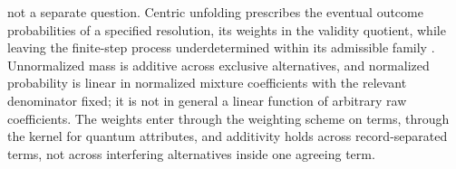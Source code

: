 not a separate question. Centric unfolding prescribes the eventual outcome probabilities of a specified resolution, its weights in the validity quotient, while leaving the finite-step process underdetermined within its admissible family \cite{Aethus}. Unnormalized mass is additive across exclusive alternatives, and normalized probability is linear in normalized mixture coefficients with the relevant denominator fixed; it is not in general a linear function of arbitrary raw coefficients. The weights enter through the weighting scheme on terms, through the kernel for quantum attributes, and additivity holds across record-separated terms, not across interfering alternatives inside one agreeing term.
